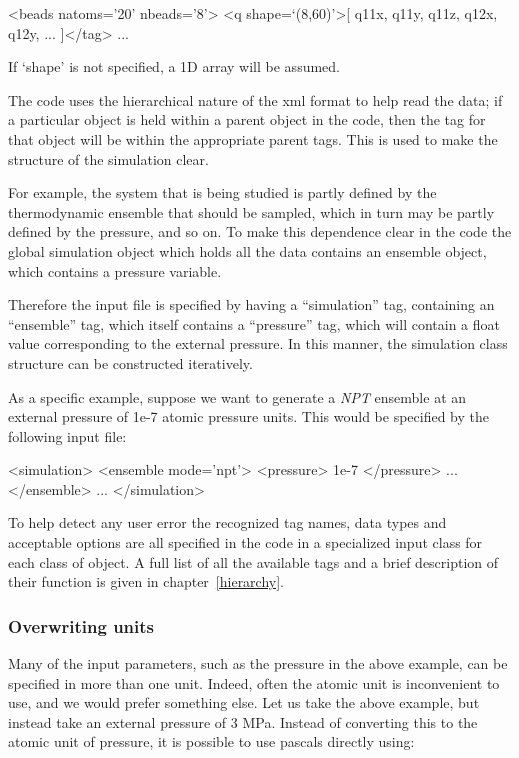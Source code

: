 \documentclass[11pt,english,fleqn]{report}
\newenvironment{code}{%
\footnotesize 
\verbatim
}{
\endverbatim
\normalsize
}
\begin{document}
\begin{code}
<beads natoms='20' nbeads='8'>
   <q shape=`(8,60)'>[ q11x, q11y, q11z, q12x, q12y, ... ]</tag>
   ...
\end{code}

If `shape' is not specified, a 1D array will be assumed.

The code uses the hierarchical nature of the xml format to help read the data; if
a particular object is held within a parent object in the code, then
the tag for that object will be within the appropriate parent tags.
This is used to make the structure of the simulation clear. 

For example,
the system that is being studied is partly defined by the thermodynamic
ensemble that should be sampled, which in turn may be partly defined
by the pressure, and so on. To make this dependence clear in the code
the global simulation object which holds all the data contains
an ensemble object, which contains a pressure variable.
 
Therefore the input file is specified
by having a {}``simulation'' tag, containing an {}``ensemble''
tag, which itself contains a {}``pressure'' tag, which will contain
a float value corresponding to the external pressure. In this
manner, the simulation class structure can be constructed iteratively.

As a specific example, suppose we want to generate a \emph{NPT} ensemble at an external
pressure of 1e-7 atomic pressure units. This would be specified by
the following input file: 

\begin{code}
<simulation>
   <ensemble mode='npt'>
      <pressure> 1e-7 </pressure>
      ...
   </ensemble>
   ...
</simulation>
\end{code}

To help detect any user error the recognized tag names, data types
and acceptable options are all specified in the code in a specialized
input class for each class of object. A full list of all the available
tags and a brief description of their function is given in chapter~\ref{hierarchy}.


\subsubsection{Overwriting units}

\label{inputunits}

Many of the input parameters, such as the pressure in the above example,
can be specified in more than one unit. Indeed, often the atomic unit
is inconvenient to use, and we would prefer something else. Let us
take the above example, but instead take an external pressure of 3
MPa. Instead of converting this to the atomic unit of pressure, it
is possible to use pascals directly using:
\end{document}
